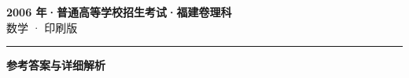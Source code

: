 \documentclass[zihao=5, a4paper]{ctexart}
\begin{document}
\begin{center}
  {\Large\bfseries 2006 年·普通高等学校招生考试·福建卷理科}\\[4pt]
  {\large 数学 · 印刷版}
\end{center}
\medskip
{}

\par\bigskip\hrule\bigskip
{}
\begin{center}{\large\bfseries 参考答案与详细解析}\end{center}
\smallskip

\end{document}
